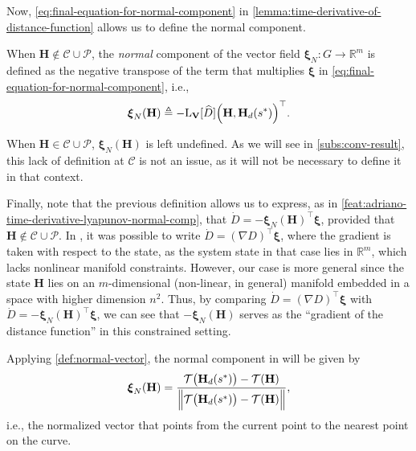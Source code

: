 Now, \eqref{eq:final-equation-for-normal-component} in \cref{lemma:time-derivative-of-distance-function} allows us to define the normal component. 
\begin{definition}  \label{def:normal-vector}
    When $\mathbf{H} \not \in \mathcal{C} \cup \mathcal{P}$, the \emph{normal} component of the vector field $\boldsymbol{\xi}_N: G\to\mathbb{R}^m$ is defined as the negative transpose of the term that multiplies $\boldsymbol{\xi}$ in \eqref{eq:final-equation-for-normal-component}, i.e., 
    \begin{align}
        \boldsymbol{\xi}_N(\mathbf{H}) \triangleq -\text{L}_{\mathbf{V}}[\widehat{D}]\Bigl(\mathbf{H}, \mathbf{H}_d(s^*)\Bigr)^{\top}.
    \end{align}
\end{definition}
When $\mathbf{H} \in \mathcal{C} \cup \mathcal{P}$, $\boldsymbol{\xi}_N(\mathbf{H})$ is left undefined. As we will see in \cref{subs:conv-result}, this lack of definition at $\mathcal{C}$ is not an issue, as it will not be necessary to define it in that context. 

Finally, note that the previous definition allows us to express, as in \cref{feat:adriano-time-derivative-lyapunov-normal-comp}, that $\dot{D} = -\boldsymbol{\xi}_N(\mathbf{H})^{\top}\boldsymbol{\xi}$, provided that $\mathbf{H} \not \in \mathcal{C} \cup \mathcal{P}$. In \citet{Rezende2022}, it was possible to write $\dot{D} = (\nabla D)^{\top} \boldsymbol{\xi}$, where the gradient is taken with respect to the state, as the system state in that case lies in $\mathbb{R}^m$, which lacks nonlinear manifold constraints. However, our case is more general since the state $\mathbf{H}$ lies on an $m$-dimensional (non-linear, in general) manifold embedded in a space with higher dimension $n^2$. Thus, by comparing $\dot{D} = (\nabla D)^{\top} \boldsymbol{\xi}$ with $\dot{D} = -\boldsymbol{\xi}_N(\mathbf{H})^{\top}\boldsymbol{\xi}$, we can see that $-\boldsymbol{\xi}_N(\mathbf{H})$ serves as the ``gradient of the distance function'' in this constrained setting.

\begin{example}\label{example:xi_N_rezende}
    Applying \cref{def:normal-vector}, the normal component in \citet{Rezende2022} will be given by
    \begin{align*}
        \boldsymbol{\xi}_{N}(\mathbf{H})= \frac{\mathcal{T}\bigl(\mathbf{H}_d(s^*)\bigr) - \mathcal{T}(\mathbf{H})}{\Bigl\|\mathcal{T}\bigl(\mathbf{H}_d(s^*)\bigr) - \mathcal{T}(\mathbf{H})\Bigr\|},  
    \end{align*}
     i.e., the normalized vector that points from the current point to the nearest point on the curve.
\end{example}

